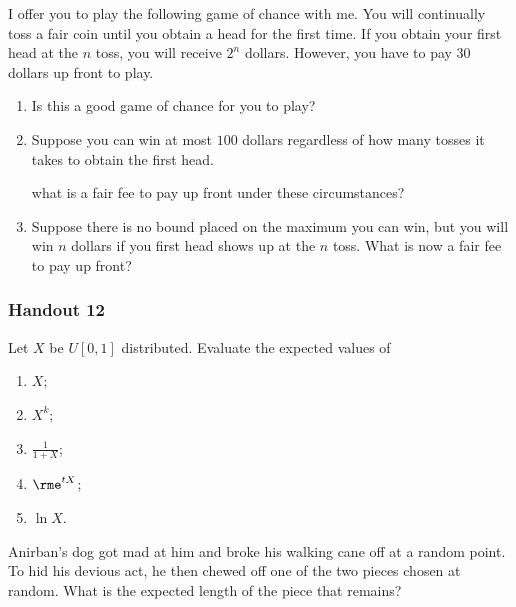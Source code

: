 \begin{problem}[Handout 11, \# 5]
  I offer you to play the following game of chance with me. You will
  continually toss a fair coin until you obtain a head for the first
  time. If you obtain your first head at the \(n\) toss, you
  will receive \(2^n\) dollars. However, you have to pay \(30\) dollars up
  front to play.
  \begin{enumerate}[label=(\alph*),noitemsep]
  \item Is this a good game of chance for you to play?
  \item Suppose you can win at most \(100\) dollars regardless of how many
    tosses it takes to obtain the first head.

    \noindent what is a fair fee to pay up front under these circumstances?
  \item Suppose there is no bound placed on the maximum you can win, but
    you will win \(n\) dollars if you first head shows up at the
    \(n\) toss. What is now a fair fee to pay up front?
  \end{enumerate}
\end{problem}
\begin{solution*}
\end{solution*}

\subsubsection{Handout 12}
\begin{problem}[Handout 12, \# 6]
  Let \(X\) be \(U[0,1]\) distributed. Evaluate the expected values of
  \begin{enumerate}[label=(\alph*),noitemsep]
  \item  \(X\);
  \item \(X^k\);
  \item \(\frac{1}{1+X}\);
  \item \(\rme^{tX}\);
  \item \(\ln X\).
  \end{enumerate}
\end{problem}
\begin{solution*}
\end{solution*}

\begin{problem}[Handout 12, \# 12]
  Anirban's dog got mad at him and broke his walking cane off at a random
  point. To hid his devious act, he then chewed off one of the two pieces
  chosen at random. What is the expected length of the piece that remains?
\end{problem}
\begin{solution*}
\end{solution*}

